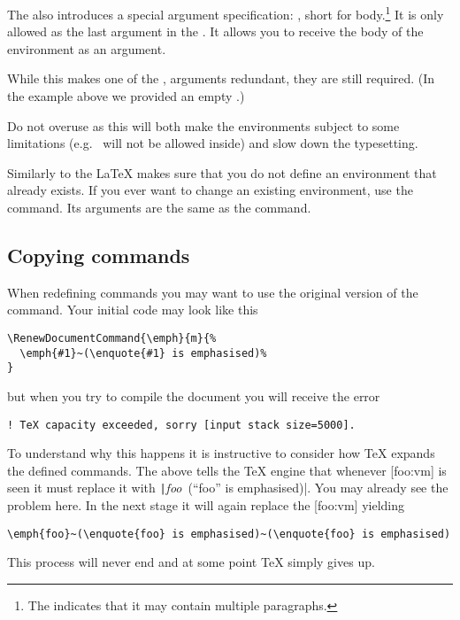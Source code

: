 The  also introduces a special argument
specification: , short for body.\footnote{The \cargv{+} indicates
  that it may contain multiple paragraphs.} It is only allowed as the last
argument in the . It allows you to receive the body of the
environment as an argument.
While this makes one of the ,  arguments redundant,
they are still required. (In the example above we provided an empty .)

Do not overuse  as this will both make the environments subject to
some limitations (e.g.\  will not be allowed inside) and slow down the
typesetting.

Similarly to the  \LaTeX{} makes sure that you do not
define an environment that already exists. If you ever want to change an
existing environment, use the  command. Its
arguments are the same as the  command.

\subsection{Copying commands}\label{sec:copyingcommands}

When redefining commands you may want to use the original version of the
command. Your initial code may look like this
\begin{verbatim}
\RenewDocumentCommand{\emph}{m}{%
  \emph{#1}~(\enquote{#1} is emphasised)%
}
\end{verbatim}
but when you try to compile the document you will receive the error
\begin{verbatim}
! TeX capacity exceeded, sorry [input stack size=5000].
\end{verbatim}

To understand why this happens it is instructive to consider how \TeX{} expands
the defined commands. The above  tells the \TeX{}
engine that whenever [foo:vm] is seen it must replace it with
\texttt|\emph{foo}~(\enquote{foo} is emphasised)|. You may already see the
problem here. In the next stage it will again replace the [foo:vm]
yielding
\begin{verbatim}
\emph{foo}~(\enquote{foo} is emphasised)~(\enquote{foo} is emphasised)
\end{verbatim}
This process will never end and at some point \TeX{}
simply gives up.

